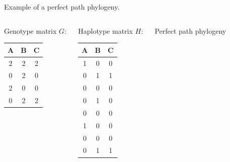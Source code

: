\documentclass{beamer}
\begin{document}
\begin{frame}{Example of a perfect path phylogeny.}
  \begin{columns}[t]
    \begin{exampleblock}{Genotype matrix}
      $G\colon$
      \begin{tabular}{ccc}
        A & B & C \\\hline
        2 & 2 & 2 \\
        0 & 2 & 0 \\
        2 & 0 & 0 \\
        0 & 2 & 2 
      \end{tabular}
    \end{exampleblock}

    \begin{exampleblock}{Haplotype matrix}
      $H\colon$
      \begin{tabular}{ccc}
        A & B & C \\\hline
        1 & 0 & 0 \\
        0 & 1 & 1 \\
        0 & 0 & 0 \\
        0 & 1 & 0 \\
        0 & 0 & 0 \\
        1 & 0 & 0 \\
        0 & 0 & 0 \\
        0 & 1 & 1 
      \end{tabular}
    \end{exampleblock}

    \begin{exampleblock}{Perfect path phylogeny}
      \begin{center}
      \end{center}
    \end{exampleblock}
  \end{columns}
\end{frame}
\end{document}
